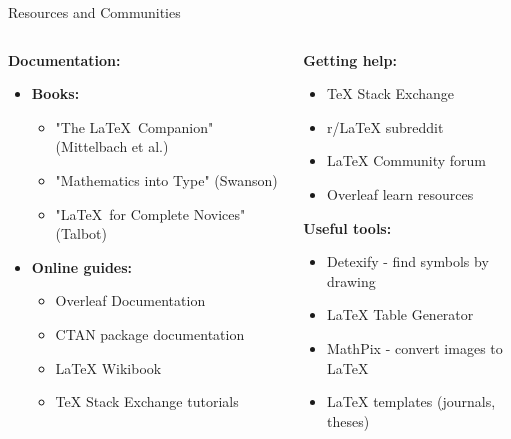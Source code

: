      \begin{frame}{Resources and Communities}
          \begin{columns}
               \begin{column}{0.5\textwidth}
                    \textbf{Documentation:}
                    \begin{itemize}
                         \item \textbf{Books:}
                         \begin{itemize}
                              \item "The \LaTeX\ Companion" (Mittelbach et al.)
                              \item "Mathematics into Type" (Swanson)
                              \item "\LaTeX\ for Complete Novices" (Talbot)
                         \end{itemize}
                         
                         \item \textbf{Online guides:}
                         \begin{itemize}
                              \item Overleaf Documentation
                              \item CTAN package documentation
                              \item LaTeX Wikibook
                              \item TeX Stack Exchange tutorials
                         \end{itemize}
                    \end{itemize}
               \end{column}
               
               \begin{column}{0.5\textwidth}
                    \textbf{Getting help:}
                    \begin{itemize}
                         \item TeX Stack Exchange
                         \item r/LaTeX subreddit
                         \item LaTeX Community forum
                         \item Overleaf learn resources
                    \end{itemize}
                    
                    \textbf{Useful tools:}
                    \begin{itemize}
                         \item Detexify - find symbols by drawing
                         \item LaTeX Table Generator
                         \item MathPix - convert images to LaTeX
                         \item LaTeX templates (journals, theses)
                    \end{itemize}
               \end{column}
          \end{columns}
          

\end{frame}
